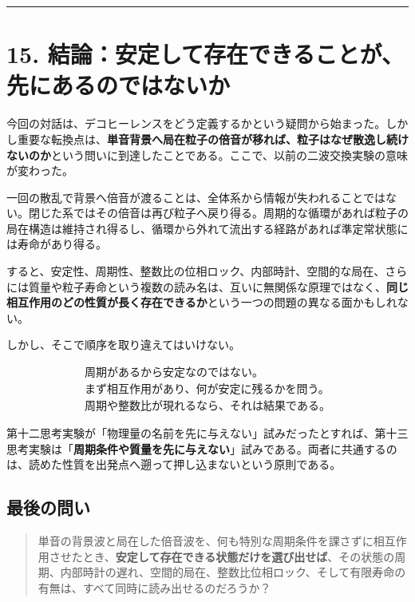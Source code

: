 \documentclass[
  a4paper,
]{ltjsarticle}
\begin{document}
\begin{center}\rule{0.5\linewidth}{0.5pt}\end{center}

\section{15.
結論：安定して存在できることが、先にあるのではないか}\label{ux7d50ux8ad6ux5b89ux5b9aux3057ux3066ux5b58ux5728ux3067ux304dux308bux3053ux3068ux304cux5148ux306bux3042ux308bux306eux3067ux306fux306aux3044ux304b}

今回の対話は、デコヒーレンスをどう定義するかという疑問から始まった。しかし重要な転換点は、\textbf{単音背景へ局在粒子の倍音が移れば、粒子はなぜ散逸し続けないのか}という問いに到達したことである。ここで、以前の二波交換実験の意味が変わった。

一回の散乱で背景へ倍音が渡ることは、全体系から情報が失われることではない。閉じた系ではその倍音は再び粒子へ戻り得る。周期的な循環があれば粒子の局在構造は維持され得るし、循環から外れて流出する経路があれば準定常状態には寿命があり得る。

すると、安定性、周期性、整数比の位相ロック、内部時計、空間的な局在、さらには質量や粒子寿命という複数の読み名は、互いに無関係な原理ではなく、\textbf{同じ相互作用のどの性質が長く存在できるか}という一つの問題の異なる面かもしれない。

しかし、そこで順序を取り違えてはいけない。

\[
\boxed{\begin{array}{c}
\text{周期があるから安定なのではない。}
\\
\text{まず相互作用があり、何が安定に残るかを問う。}
\\
\text{周期や整数比が現れるなら、それは結果である。}
\end{array}}
\]

第十二思考実験が「物理量の名前を先に与えない」試みだったとすれば、第十三思考実験は「\textbf{周期条件や質量を先に与えない}」試みである。両者に共通するのは、読めた性質を出発点へ遡って押し込まないという原則である。

\subsection{最後の問い}\label{ux6700ux5f8cux306eux554fux3044}

\begin{quote}
単音の背景波と局在した倍音波を、何も特別な周期条件を課さずに相互作用させたとき、\textbf{安定して存在できる状態だけを選び出せば}、その状態の周期、内部時計の遅れ、空間的局在、整数比位相ロック、そして有限寿命の有無は、すべて同時に読み出せるのだろうか？
\end{quote}
\end{document}
